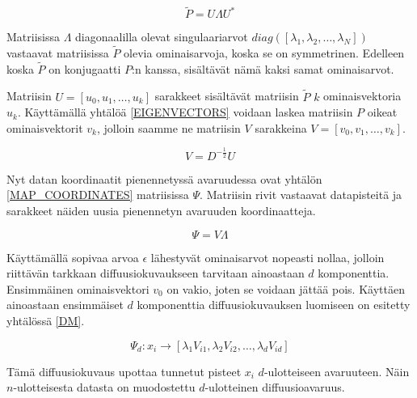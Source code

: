 \begin{equation}
\tilde{P} = U \Lambda U^*
\label{SVD}
\end{equation}


\noindent Matriisissa $\Lambda$ diagonaalilla olevat singulaariarvot $diag([\lambda_1, \lambda_2, \dots, \lambda_N])$ vastaavat matriisissa $\tilde{P}$ olevia ominaisarvoja, koska se on symmetrinen. Edelleen koska $\tilde{P}$ on konjugaatti $P$:n kanssa, sisältävät nämä kaksi samat ominaisarvot. 

Matriisin $U = [ u_0, u_1, \dots, u_k ]$ sarakkeet sisältävät
matriisin $\tilde{P}$ $k$ ominaisvektoria $u_k$. Käyttämällä yhtälöä
\ref{EIGENVECTORS} voidaan laskea matriisin $P$ oikeat ominaisvektorit $v_k$, jolloin 
saamme ne matriisin $V$ sarakkeina  $V = [v_0, v_1, \dots, v_k]$.  

\begin{equation}
V = D^{-\frac{1}{2}} U
\label{EIGENVECTORS}
\end{equation}

\noindent Nyt datan koordinaatit pienennetyssä avaruudessa ovat yhtälön \ref{MAP_COORDINATES} matriisissa $\Psi$. Matriisin rivit vastaavat datapisteitä ja sarakkeet näiden uusia pienennetyn avaruuden koordinaatteja.

\begin{equation}
\Psi = V \Lambda
\label{MAP_COORDINATES}
\end{equation}


\noindent Käyttämällä sopivaa arvoa $\epsilon$ lähestyvät ominaisarvot nopeasti nollaa, jolloin riittävän tarkkaan diffuusiokuvaukseen tarvitaan ainoastaan $d$ komponenttia. Ensimmäinen ominaisvektori $v_0$ on vakio, joten se voidaan jättää pois.
Käyttäen ainoastaan ensimmäiset $d$ komponenttia diffuusiokuvauksen luomiseen on esitetty yhtälössä \ref{DM}.

\begin{equation}
\Psi_d : x_i \to \left[ \lambda_1 V_{i1}, \lambda_2 V_{i2}, \dots, \lambda_d V_{id} \right]
\label{DM}
\end{equation}

\noindent Tämä diffuusiokuvaus upottaa tunnetut pisteet $x_i$ $d$-ulotteiseen avaruuteen. 
Näin $n$-ulotteisesta datasta on muodostettu $d$-ulotteinen diffuusioavaruus.

